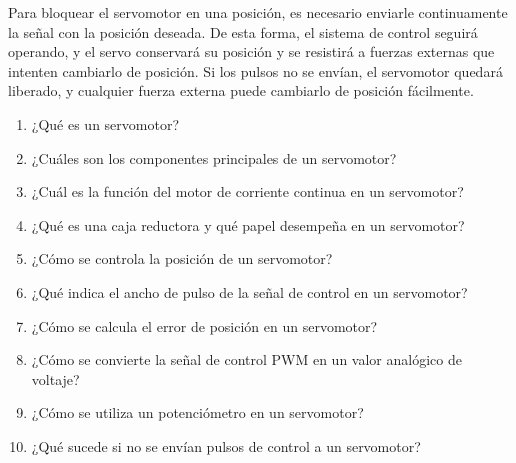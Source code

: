 \documentclass[../main]{subfiles}
\begin{document}
Para bloquear el servomotor en una posición, es necesario enviarle continuamente la señal con la posición deseada. De esta forma, el sistema de control seguirá operando, y el servo conservará su posición y se resistirá a fuerzas externas que intenten cambiarlo de posición. Si los pulsos no se envían, el servomotor quedará liberado, y cualquier fuerza externa puede cambiarlo de posición fácilmente.


\begin{enumerate}
\item ¿Qué es un servomotor?
\item ¿Cuáles son los componentes principales de un servomotor?
\item ¿Cuál es la función del motor de corriente continua en un servomotor?
\item ¿Qué es una caja reductora y qué papel desempeña en un servomotor?
\item ¿Cómo se controla la posición de un servomotor?
\item ¿Qué indica el ancho de pulso de la señal de control en un servomotor?
\item ¿Cómo se calcula el error de posición en un servomotor?
\item ¿Cómo se convierte la señal de control PWM en un valor analógico de voltaje?
\item ¿Cómo se utiliza un potenciómetro en un servomotor?
\item ¿Qué sucede si no se envían pulsos de control a un servomotor?
\end{enumerate}
\end{document}
